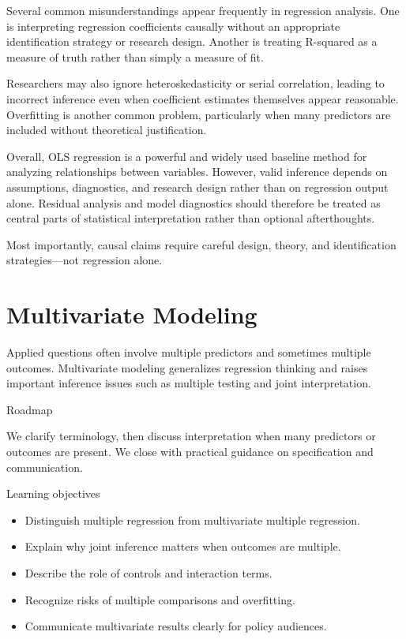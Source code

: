 \documentclass[
  11pt,
  oneside]{book}
\providecommand{\tightlist}{%
  \setlength{\itemsep}{0pt}\setlength{\parskip}{0pt}}
\begin{document}
Several common misunderstandings appear frequently in regression analysis. One is interpreting regression coefficients causally without an appropriate identification strategy or research design. Another is treating R-squared as a measure of truth rather than simply a measure of fit.

Researchers may also ignore heteroskedasticity or serial correlation, leading to incorrect inference even when coefficient estimates themselves appear reasonable. Overfitting is another common problem, particularly when many predictors are included without theoretical justification.

Overall, OLS regression is a powerful and widely used baseline method for analyzing relationships between variables. However, valid inference depends on assumptions, diagnostics, and research design rather than on regression output alone. Residual analysis and model diagnostics should therefore be treated as central parts of statistical interpretation rather than optional afterthoughts.

Most importantly, causal claims require careful design, theory, and identification strategies---not regression alone.

\chapter{Multivariate Modeling}\label{multivariate}

Applied questions often involve multiple predictors and sometimes multiple outcomes. Multivariate modeling generalizes regression thinking and raises important inference issues such as multiple testing and joint interpretation.

Roadmap

We clarify terminology, then discuss interpretation when many predictors or outcomes are present. We close with practical guidance on specification and communication.

Learning objectives

\begin{itemize}
\tightlist
\item
  Distinguish multiple regression from multivariate multiple regression.
\item
  Explain why joint inference matters when outcomes are multiple.
\item
  Describe the role of controls and interaction terms.
\item
  Recognize risks of multiple comparisons and overfitting.
\item
  Communicate multivariate results clearly for policy audiences.
\end{itemize}
\end{document}
